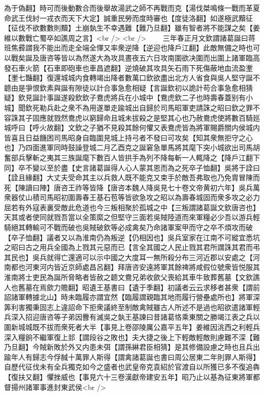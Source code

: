 為于偽翻】時可而後動數合而後舉故湯武之師不再戰而克【湯伐桀鳴條一戰而革夏命武王伐紂一戎衣而天下大定】誠重民勞而度時審也【度徒洛翻】如遂極武黷征【征伐不欲數數則黷】土崩埶生不幸遇難【難乃旦翻】雖有智者將不能謀之矣【姜維以數戰亡蜀卒如譙周之言】<br />
<br />
　　三年春正月文欽謂諸葛誕曰蒋班焦彛謂我不能出而走全端全懌又率衆逆降【逆迎也降戶江翻】此敵無備之時也可以戰矣誕及唐咨等皆以為然遂大為攻具晝夜五六日攻南圍欲决圍而出圍上諸軍臨高發石車火箭【石車即砲車也車昌遮翻】逆燒破其攻具矢石雨下死傷蔽地血流盈壍【壍七豔翻】復還城城内食轉竭出降者數萬口欽欲盡出北方人省食與吳人堅守誕不聼由是爭恨欽素與誕有隙徒以計合事急愈相疑【言誕欽初以詭計苟合事急愈相猜疑】欽見誕計事誕遂殺欽欽子鴦虎將兵在小城中【鴦虎欽二子也時壽春蓋别有小城】聞欽死勒兵赴之衆不為用遂單走踰城出自歸於司馬昭軍吏請誅之昭曰欽之罪不容誅其子固應就戮然鴦虎以窮歸命且城未拔殺之是堅其心也乃赦鴦虎使將數百騎廵城呼曰【呼火故翻】文欽之子猶不見殺其餘何懼又表鴦虎皆為將軍賜爵關内侯城内皆喜且日益饑困司馬昭身自臨圍見城上持弓者不發曰可攻矣【知其衆無拒守之心也】乃四面進軍同時鼓譟登城二月乙酉克之誕窘急單馬將其麾下突小城欲出司馬胡奮部兵擊斬之夷其三族誕麾下數百人皆拱手為列不降每斬一人輒降之【降戶江翻下同】卒不變以至於盡【史言諸葛誕得人心人蒙其恩而為之死卒子恤翻】吳將于詮曰【詮且緣翻】大丈夫受命其主以兵救人既不能克又束手於敵吾弗取也乃免胄冒陳而死【陳讀曰陣】唐咨王祚等皆降【唐咨本魏人降吳見七十卷文帝黄初六年】吳兵萬衆器仗山積司馬昭初圍壽春王基石苞等皆欲急攻之昭以為壽春城固而衆多攻之必力屈若有外寇表裏受敵此危道也今三叛相聚於孤城之中【三叛謂諸葛誕文欽唐咨也】天其或者使同就戮吾當以全策縻之但堅守三面若吳賊陸道而來軍糧必少吾以游兵輕騎絕其轉輸可不戰而破也吳賊破欽等必成禽矣乃命諸軍案甲而守之卒不煩攻而破【卒子恤翻】議者又以為淮南仍為叛逆【仍相因也】吳兵室家在江南不可縱宜悉坑之昭曰古之用兵全國為上戮其元惡而已【言全其國之人民止戮其君所謂誅其君而弔其民也】吳兵就得亡還適可以示中國之大度耳一無所殺分布三河近郡以安處之【河南都也河東河内皆近京師處昌呂翻】拜唐咨安遠將軍其餘禆將咸假位號衆皆悦服其淮南將士吏民為誕所脅略者皆赦之聼文鴦兄弟收歛父喪給其車牛致葬舊墓【文欽譙人也舊墓在焉歛力贍翻】昭遺王基書曰【遺于季翻】初議者云云求移者甚衆【謂前詔諸軍轉據北山】時未臨履亦謂宜然【臨履謂親臨其地而履行營壘處所也】將軍深筭利害獨秉固志上違詔命下拒衆議終至制敵禽賊雖古人所述不是過也昭欲遣諸軍輕兵深入招迎唐咨等子弟因釁有滅吳之埶王基諫曰昔諸葛恪乘東關之勝竭江表之兵以圍新城城既不拔而衆死者大半【事見上卷邵陵厲公嘉平五年】姜維因洮西之利輕兵深入糧餉不繼軍復上邽【謂段谷之敗也】夫大捷之後上下輕敵輕敵則慮難不深【難乃旦翻】今賊新敗於外又内患未弭【謂孫綝君臣相猜】是其修備設慮之時也且兵出踰年人有歸志今俘馘十萬罪人斯得【謂禽諸葛誕也書曰周公居東二年則罪人斯得】自歷代征伐未有全兵獨克如今之盛者也武皇帝克袁紹於官渡自以所獲已多不復追犇【復扶又翻】懼挫威也【事見六十三卷漢獻帝建安五年】昭乃止以基為征東將軍都督揚州諸軍事進封東武侯<br />
